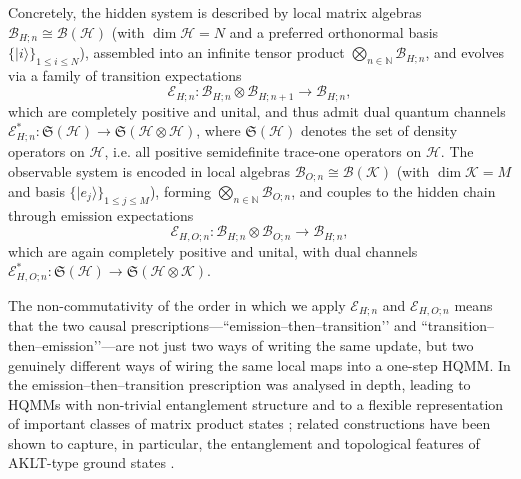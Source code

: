 \documentclass[11pt, reco]{article}
\begin{document}
Concretely, the hidden system is described by local matrix algebras \(\mathcal{B}_{H;n}\cong\mathcal{B}(\mathcal{H})\) (with \(\dim\mathcal{H}=N\) and a preferred orthonormal basis \(\{|i\rangle\}_{1\le i\le N}\)), assembled into an infinite tensor product \(\bigotimes_{n\in\mathbb{N}}\mathcal{B}_{H;n}\), and evolves via a family of transition expectations
\[
\mathcal{E}_{H;n}:\mathcal{B}_{H;n}\otimes\mathcal{B}_{H;n+1}\to\mathcal{B}_{H;n},
\]
which are completely positive and unital, and thus admit dual quantum channels \(\mathcal{E}_{H;n}^*:\mathfrak{S}(\mathcal{H})\to\mathfrak{S}(\mathcal{H}\otimes\mathcal{H})\), where \(\mathfrak{S}(\mathcal{H})\) denotes the set of density operators on \(\mathcal{H}\), i.e. all positive semidefinite trace-one operators on \(\mathcal{H}\). The observable system is encoded in local algebras \(\mathcal{B}_{O;n}\cong\mathcal{B}(\mathcal{K})\) (with \(\dim\mathcal{K}=M\) and basis \(\{|e_j\rangle\}_{1\le j\le M}\)), forming \(\bigotimes_{n\in\mathbb{N}}\mathcal{B}_{O;n}\), and couples to the hidden chain through emission expectations
\[
\mathcal{E}_{H,O;n}:\mathcal{B}_{H;n}\otimes\mathcal{B}_{O;n}\to\mathcal{B}_{H;n},
\]
which are again completely positive and unital, with dual channels \(\mathcal{E}_{H,O;n}^*:\mathfrak{S}(\mathcal{H})\to\mathfrak{S}(\mathcal{H}\otimes\mathcal{K})\).



The non-commutativity of the order in which we apply \(\mathcal{E}_{H;n}\) and \(\mathcal{E}_{H,O;n}\) means that the two causal prescriptions—“emission–then–transition’’ and “transition–then–emission’’—are not just two ways of writing the same update, but two genuinely different ways of wiring the same local maps into a one-step HQMM. In \cite{AGLS24Q} the emission–then–transition prescription was analysed in depth, leading to HQMMs with non-trivial entanglement structure \cite{SS23} and to a flexible representation of important classes of matrix product states \cite{Sou25}; related constructions have been shown to capture, in particular, the entanglement and topological features of AKLT-type ground states \cite{SouissiAndolsi25}.
\end{document}
